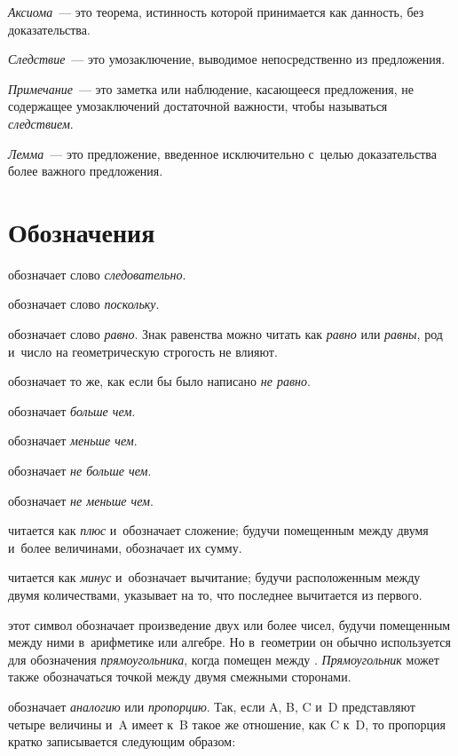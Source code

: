\documentclass[letters]{byrne-book}
\begin{document}
\emph{Аксиома}~— это теорема, истинность которой принимается как данность, без доказательства.

\emph{Следствие}~— это умозаключение, выводимое непосредственно из предложения.

\emph{Примечание}~— это заметка или наблюдение, касающееся предложения, не содержащее умозаключений достаточной важности, чтобы называться \emph{следствием}.

\emph{Лемма}~— это предложение, введенное исключительно с~целью доказательства более важного предложения.



\vfill\pagebreak

\chapter*{Обозначения}

\symb{$\therefore$}
 обозначает слово \emph{следовательно}.

\symb{$\because$}
 обозначает слово \emph{поскольку}.

\symb{$=$}
 обозначает слово \emph{равно}. Знак равенства можно читать как \emph{равно} или \emph{равны}, род и~число на геометрическую строгость не влияют.

\symb{$\neq$}
 обозначает то же, как если бы было написано \emph{не равно}.

\symb{$>$}
 обозначает \emph{больше чем}.

\symb{$<$}
 обозначает \emph{меньше чем}.

\symb{$\ngtr$}
 обозначает \emph{не больше чем}.

\symb{$\nless$}
 обозначает \emph{не меньше чем}.

\symb{$+$}
 читается как \emph{плюс} и~обозначает сложение; будучи помещенным между двумя и~более величинами, обозначает их сумму.

\symb{$-$}
 читается как \emph{минус} и~обозначает вычитание; будучи расположенным между двумя количествами, указывает на то, что последнее вычитается из первого.

\symb{$\times$}
 этот символ обозначает произведение двух или более чисел, будучи помещенным между ними в~арифметике или алгебре. Но в~геометрии он обычно используется для обозначения \emph{прямоугольника}, когда помещен между . \emph{Прямоугольник} может также обозначаться точкой между двумя смежными сторонами.

\symb{$:\ ::\ :$}
 обозначает \emph{аналогию} или \emph{пропорцию}. Так, если A, B, C и~D представляют четыре величины и~A имеет к~B такое же отношение, как C к~D, то пропорция кратко записывается следующим образом:
\end{document}
